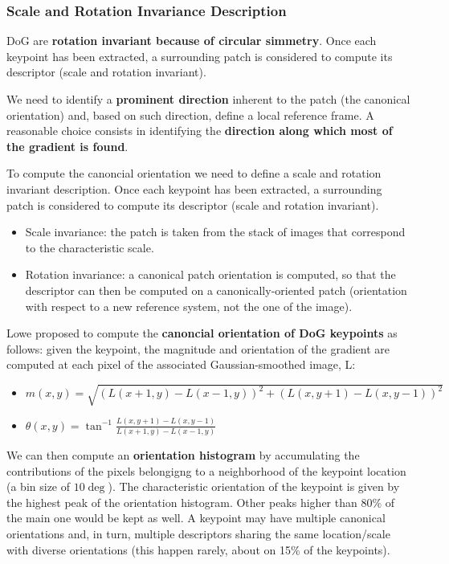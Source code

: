 \documentclass{article}
\begin{document}
\subsubsection{Scale and Rotation Invariance Description}

DoG are \textbf{rotation invariant because of circular simmetry}.
Once each keypoint has been extracted, a surrounding patch is considered to compute its descriptor (scale and rotation invariant).

We need to identify a \textbf{prominent direction} inherent to the patch (the canonical orientation) and, based on such direction, define a local reference frame.
A reasonable choice consists in identifying the \textbf{direction along which most of the gradient is found}.

To compute the canoncial orientation we need to define a scale and rotation invariant description.
Once each keypoint has been extracted, a surrounding patch is considered to compute its descriptor (scale and rotation invariant).
\begin{itemize}
  \item Scale invariance: the patch is taken from the stack of images that correspond to the characteristic scale.
  \item Rotation invariance: a canonical patch orientation is computed, so that the descriptor can then be computed on a canonically-oriented patch (orientation with respect to a new reference system, not the one of the image).
\end{itemize}

Lowe proposed to compute the \textbf{canoncial orientation of DoG keypoints} as follows: given the keypoint, the magnitude and orientation of the gradient are computed at each pixel of the associated Gaussian-smoothed image, L:

\begin{itemize}
  \item $m(x,y) = \sqrt{(L(x+1,y)-L(x-1,y))^2 + (L(x,y+1) - L(x,y-1))^2}$
  \item $\theta(x,y) = \tan^{-1}\frac{L(x,y+1)-L(x,y-1)}{L(x+1,y)-L(x-1,y)}$
\end{itemize}

We can then compute an \textbf{orientation histogram} by accumulating the contributions of the pixels belongigng to a neighborhood of the keypoint location (a bin size of $10\deg$).
The characteristic orientation of the keypoint is given by the highest peak of the orientation histogram.
Other peaks higher than $80\%$ of the main one would be kept as well.
A keypoint may have multiple canonical orientations and, in turn, multiple descriptors sharing the same location/scale with diverse orientations (this happen rarely, about on 15\% of the keypoints).
\end{document}
